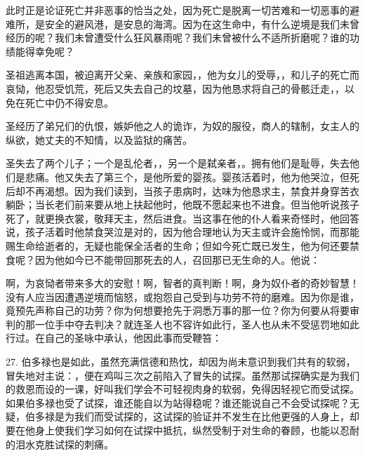 此时正是论证死亡并非恶事的恰当之处，因为死亡是脱离一切苦难和一切恶事的避难所，是安全的避风港，是安息的海湾。因为在这生命中，有什么逆境是我们未曾经历的呢？我们未曾遭受什么狂风暴雨呢？我们未曾被什么不适所折磨呢？谁的功绩能得幸免呢？\par

圣祖逃离本国，被迫离开父亲、亲族和家园，，他为女儿的受辱，，和儿子的死亡而哀恸，他忍受饥荒，死后又失去自己的坟墓，因为他恳求将自己的骨骸迁走，，以免在死亡中仍不得安息。\par

圣经历了弟兄们的仇恨，嫉妒他之人的诡诈，为奴的服役，商人的辖制，女主人的纵欲，她丈夫的不知情，以及监狱的痛苦。\par

圣失去了两个儿子；一个是乱伦者，，另一个是弑亲者，。拥有他们是耻辱，失去他们是悲痛。他又失去了第三个，是他所爱的婴孩。婴孩活着时，他为他哭泣，但死后却不再渴想。因为我们读到，当孩子患病时，达味为他恳求主，禁食并身穿苦衣躺卧；当长老们前来要从地上扶起他时，他既不愿起来也不进食。但当他听说孩子死了，就更换衣裳，敬拜天主，然后进食。当这事在他的仆人看来奇怪时，他回答说，孩子活着时他禁食哭泣是对的，因为他合理地认为天主或许会施怜悯，而那能赐生命给逝者的，无疑也能保全活者的生命；但如今死亡既已发生，他为何还要禁食呢？因为他如今已不能带回那死去的人，召回那已无生命的人。他说：\par

啊，为哀恸者带来多大的安慰！啊，智者的真判断！啊，身为奴仆者的奇妙智慧！没有人应当因遭遇逆境而恼怒，或抱怨自己受到与功劳不符的磨难。因为你是谁，竟预先声称自己的功劳？你为何想要抢先于洞悉万事的那一位？你为何要从将要审判的那一位手中夺去判决？就连圣人也不容许如此行，圣人也从未不受惩罚地如此行过。在自己的圣咏中承认，他因此事而受鞭笞：\par

27. 伯多禄也是如此，虽然充满信德和热忱，却因为尚未意识到我们共有的软弱，冒失地对主说：，便在鸡叫三次之前陷入了冒失的试探。虽然那试探确实是为我们的救恩而设的一课，好叫我们学会不可轻视肉身的软弱，免得因轻视它而受试探。如果伯多禄也受了试探，谁还能自以为站得稳呢？谁还能说自己不会受试探呢？无疑，伯多禄是为我们而受试探的，这试探的验证并不发生在比他更强的人身上，却要在他身上使我们学习如何在试探中抵抗，纵然受制于对生命的眷顾，也能以忍耐的泪水克胜试探的刺痛。\par

